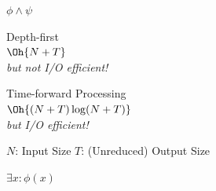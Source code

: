 \documentclass[english, aspectratio=169]{beamer}
\begin{document}
%
%
\begin{frame}{$\phi \land \psi$}
  \centering

  {\Large Depth-first}\\\vspace{5pt}
  {\LARGE $\Oh{N+T}$}\\
  {\emph{but not I/O efficient!}}

  \vspace{20pt}

  {\Large Time-forward Processing}\\\vspace{5pt}
  {\LARGE $\Oh{(N+T) \log (N+T)}$}\\
  {\emph{but I/O efficient!}}

  \vspace{20pt}

  {\large $N$: Input Size \qquad $T$: (Unreduced) Output Size}

\end{frame}

%
%
\begin{frame}
  \centering\Huge $\exists x: \phi(x)$
\end{frame}
\end{document}
